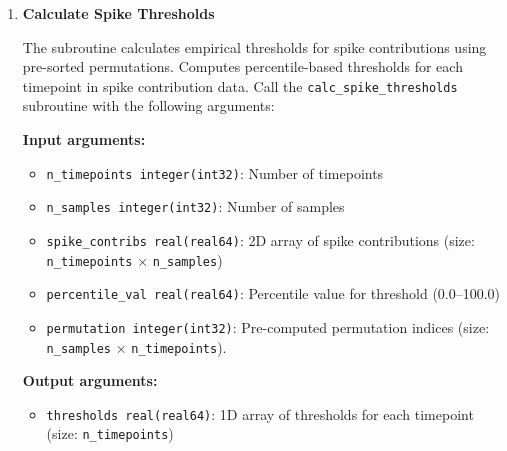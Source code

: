 \begin{enumerate}
\begin{enumerate}
\begin{enumerate}
\begin{itemize}
                            \item \texttt{ierr integer(int32)}: Error code (for error
                                  details please check
                                  \hyperref[sec:error-handling]{error handling section})
                          \end{itemize}
                          \begin{lstlisting}[language=Fortran, caption={Integrated Outlier Detection}]
call detect_outliers_integrated(contributions, n_samples,&
                                threshold, outlier_mask, ierr)
                          \end{lstlisting}
                          
                    \item \textbf{Calculate Spike Thresholds}
                          
                          The subroutine calculates empirical thresholds for spike contributions
                          using pre-sorted permutations. Computes percentile-based
                          thresholds for each timepoint in spike contribution data. Call the
                          \texttt{calc\_spike\_thresholds} subroutine with the following
                          arguments:
                          
                          \textbf{Input arguments:}
                          \begin{itemize}
                            \item \texttt{n\_timepoints integer(int32)}: Number of timepoints
                                  
                            \item \texttt{n\_samples integer(int32)}: Number of samples
                                  
                            \item \texttt{spike\_contribs real(real64)}: 2D array of spike contributions
                                  (size: \texttt{n\_timepoints} × \texttt{n\_samples})
                                  
                            \item \texttt{percentile\_val real(real64)}: Percentile value for
                                  threshold (0.0--100.0)
                                  
                            \item \texttt{permutation integer(int32)}: Pre-computed permutation
                                  indices (size: \texttt{n\_samples} × \texttt{n\_timepoints}).
                          \end{itemize}
                          \textbf{Output arguments:}
                          \begin{itemize}
                            \item \texttt{thresholds real(real64)}: 1D array of thresholds for
                                  each timepoint (size: \texttt{n\_timepoints})
                                  

\end{itemize}
\end{enumerate}
\end{enumerate}
\end{enumerate}
